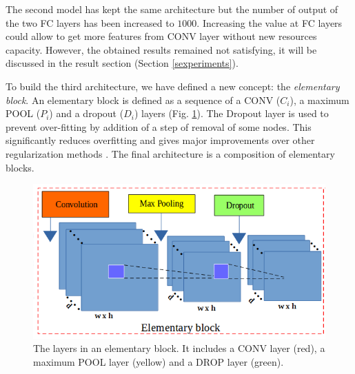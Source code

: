\documentclass[review]{elsarticle}
\begin{document}
The second model has kept the same architecture but the number of output of the two FC layers has been increased to $1000$. Increasing the value at FC layers could allow to get more features from CONV layer without new resources capacity. However, the obtained results remained not satisfying, it will be discussed in the result section (Section \ref{sexperiments}). 

To build the third architecture, we have defined a new concept: the \textit{elementary block}. An {elementary block} is defined as a sequence of a CONV ($C_{i}$), a maximum POOL ($P_i$) and a dropout ($D_i$) layers (Fig. \ref{figelementary}). The Dropout layer is used to prevent over-fitting by addition of a step of removal of some nodes. This significantly reduces overfitting and gives major improvements over other regularization methods \cite{srivastava2014dropout}. The final architecture is a composition of elementary blocks. 
\begin{figure}[h]
	\centering
	\includegraphics[scale=0.4]{images/elementary_block}
	\caption{The layers in an elementary block. It includes a CONV layer (red), a maximum POOL layer (yellow) and a DROP layer (green).}
	\label{figelementary}
\end{figure}
\end{document}
